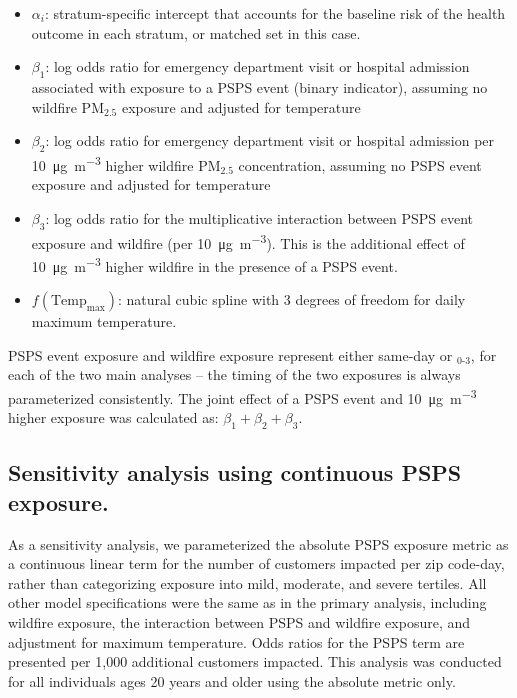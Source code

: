 \documentclass[../main.tex]{subfiles}
\begin{document}
\begin{itemize}
\item $\alpha_i$: stratum-specific intercept that accounts for the baseline risk of the health outcome in each stratum, or matched set in this case. 
\item $\beta_1$: log odds ratio for emergency department visit or hospital admission associated with exposure to a PSPS event (binary indicator), assuming no wildfire PM$_{2.5}$ exposure and adjusted for temperature
\item $\beta_2$: log odds ratio for emergency department visit or hospital admission per \SI[per-mode=symbol]{10}{\micro\gram\per\cubic\metre} higher wildfire PM$_{2.5}$ concentration, assuming no PSPS event exposure and adjusted for temperature
\item $\beta_3$: log odds ratio for the multiplicative interaction between PSPS event exposure and wildfire \PM (per \SI[per-mode=symbol]{10}{\micro\gram\per\cubic\metre}). This is the additional effect of \SI[per-mode=symbol]{10}{\micro\gram\per\cubic\metre} higher wildfire \PM in the presence of a PSPS event. 
\item $f(\mathrm{Temp_{max}})$: natural cubic spline with 3 degrees of freedom for daily maximum temperature.
\end{itemize}

\vspace{1em}

PSPS event exposure and wildfire \PM exposure represent either same-day or $_{0\text{-}3}$, for each of the two main analyses -- the timing of the two exposures is always parameterized consistently. The joint effect of a PSPS event and \SI[per-mode=symbol]{10}{\micro\gram\per\cubic\metre} higher \PM exposure was calculated as: $\beta_1 + \beta_2 + \beta_3$. 

\subsection{Sensitivity analysis using continuous PSPS exposure.}
As a sensitivity analysis, we parameterized the absolute PSPS exposure metric as a continuous linear term for the number of customers impacted per zip code-day, rather than categorizing exposure into mild, moderate, and severe tertiles. All other model specifications were the same as in the primary analysis, including wildfire \PM exposure, the interaction between PSPS and wildfire \PM exposure, and adjustment for maximum temperature. Odds ratios for the PSPS term are presented per 1,000 additional customers impacted. This analysis was conducted for all individuals ages 20 years and older using the absolute metric only.
\end{document}
